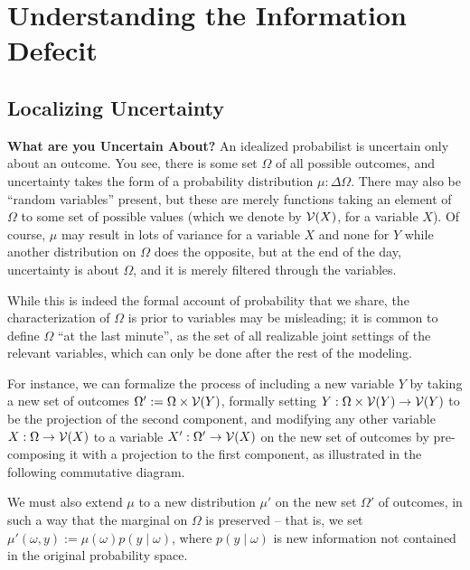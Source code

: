 \documentclass{article}
\begin{document}
	\section{Understanding the Information Defecit}

	\subsection{Localizing Uncertainty}
    \textbf{What are you Uncertain About?}
    An idealized probabilist is uncertain only about an outcome. You see, there is some set $\Omega$ of all possible outcomes, and uncertainty takes the form of a probability distribution $\mu : \Delta\Omega$. There may also be ``random variables'' present, but these are merely functions taking an element of $\Omega$ to some set of possible values (which we denote by $\mathcal V(X)$, for a variable $X$).
    Of course, $\mu$ may result in lots of variance for a variable $X$ and none for $Y$ while another distribution on $\Omega$ does the opposite,
    but at the end of the day, uncertainty is about $\Omega$, and it is merely filtered through the variables.

    While this is indeed the formal account of probability that we share, the characterization of $\Omega$ is prior to variables may be misleading; it is common to define $\Omega$ ``at the last minute'', as the set of all realizable joint settings of the relevant variables, which can only be done after the rest of the modeling.

    \begin{example}
        For instance, we can formalize the process of including a new variable $Y$ by taking a new set of outcomes $\Omega' := \Omega \times \mathcal V(Y)$, formally setting $Y : \Omega \times \mathcal V(Y) \to \mathcal V(Y)$ to be the projection of the second component, and modifying any other variable $X : \Omega \to \mathcal V(X)$ to a variable $X' : \Omega' \to \mathcal V(X)$ on the new set of outcomes by pre-composing it with a projection to the first component, as illustrated in the following commutative diagram.
        \begin{center}
        \end{center}

        We must also extend $\mu$ to a new distribution $\mu'$ on the new set $\Omega'$ of outcomes, in such a way that the marginal on $\Omega$ is preserved -- that is, we set $\mu'(\omega, y) := \mu(\omega) p(y \mid \omega)$, where $p(y \mid \omega)$ is new information not contained in the original probability space.
    \end{example}
\end{document}
